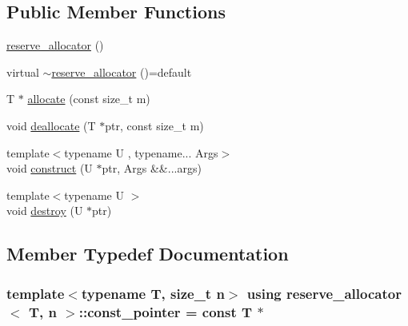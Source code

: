 \subsection*{Public Member Functions}
\begin{DoxyCompactItemize}
\item 
\hyperlink{classreserve__allocator_a6e20af249475b4b876cb50f6c180c4a9}{reserve\+\_\+allocator} ()
\item 
virtual \hyperlink{classreserve__allocator_aa2a6cb73017c9f2a24153c4c0fc3d7ea}{$\sim$reserve\+\_\+allocator} ()=default
\item 
T $\ast$ \hyperlink{classreserve__allocator_a499b48726cad65f443ed3bb7dd0268f2}{allocate} (const size\+\_\+t m)
\item 
void \hyperlink{classreserve__allocator_a9a3fc0c98cd6381e926a2a735c4cbb68}{deallocate} (T $\ast$ptr, const size\+\_\+t m)
\item 
{\footnotesize template$<$typename U , typename... Args$>$ }\\void \hyperlink{classreserve__allocator_a2d05e7ee613d9f22ace630d3a48a0930}{construct} (U $\ast$ptr, Args \&\&...args)
\item 
{\footnotesize template$<$typename U $>$ }\\void \hyperlink{classreserve__allocator_a0e036e2fe862aec6878d418cd3380c11}{destroy} (U $\ast$ptr)
\end{DoxyCompactItemize}


\subsection{Member Typedef Documentation}
\subsubsection[{\texorpdfstring{const\+\_\+pointer}{const_pointer}}]{\setlength{\rightskip}{0pt plus 5cm}template$<$typename T, size\+\_\+t n$>$ using {\bf reserve\+\_\+allocator}$<$ T, n $>$\+::{\bf const\+\_\+pointer} =  const T $\ast$}\hypertarget{classreserve__allocator_a258a73c5b6817b44358fab32cc8f37f4}{}\label{classreserve__allocator_a258a73c5b6817b44358fab32cc8f37f4}
